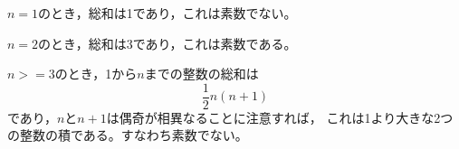 \documentclass{article}
\begin{document}
$n = 1$のとき，総和は1であり，これは素数でない。

$n = 2$のとき，総和は3であり，これは素数である。

$n >= 3$のとき，1から$n$までの整数の総和は
$$\frac{1}{2} n (n + 1)$$
であり，$n$と$n + 1$は偶奇が相異なることに注意すれば，
これは1より大きな2つの整数の積である。すなわち素数でない。
\end{document}
